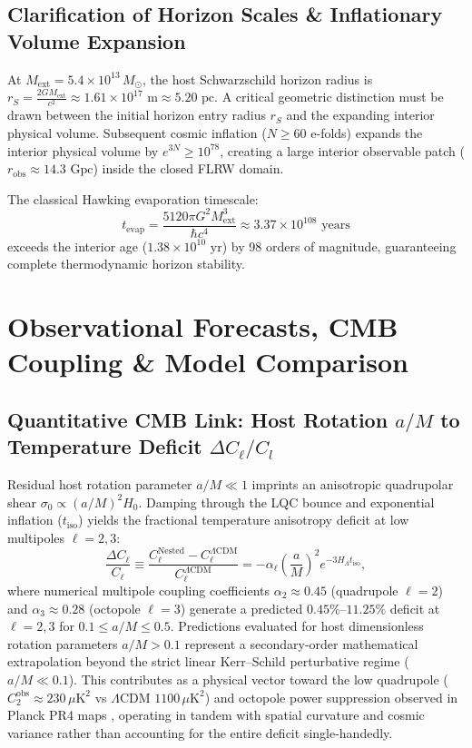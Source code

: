 \documentclass[11pt,a4paper]{article}
\begin{document}
\subsection{Clarification of Horizon Scales \& Inflationary Volume Expansion}\label{sec:causal_decoupling}
At $M_{\text{ext}} = 5.4 \times 10^{13} \, M_\odot$, the host Schwarzschild horizon radius is $r_S = \frac{2GM_{\text{ext}}}{c^2} \approx 1.61 \times 10^{17} \text{ m} \approx 5.20 \text{ pc}$. A critical geometric distinction must be drawn between the initial horizon entry radius $r_S$ and the expanding interior physical volume. Subsequent cosmic inflation ($N \ge 60$ e-folds) expands the interior physical volume by $e^{3N} \ge 10^{78}$, creating a large interior observable patch ($r_{\text{obs}} \approx 14.3 \text{ Gpc}$) inside the closed FLRW domain.

The classical Hawking evaporation timescale:
\begin{equation}\label{eq:hawking_time}
    t_{\text{evap}} = \frac{5120 \pi G^2 M_{\text{ext}}^3}{\hbar c^4} \approx 3.37 \times 10^{108} \text{ years}
\end{equation}
exceeds the interior age ($1.38 \times 10^{10} \text{ yr}$) by 98 orders of magnitude, guaranteeing complete thermodynamic horizon stability.

\section{Observational Forecasts, CMB Coupling \& Model Comparison}\label{sec:observational}

\subsection{Quantitative CMB Link: Host Rotation $a/M$ to Temperature Deficit $\Delta C_\ell / C_l$}\label{sec:cmb_suppression}
Residual host rotation parameter $a/M \ll 1$ imprints an anisotropic quadrupolar shear $\sigma_0 \propto (a/M)^2 H_0$. Damping through the LQC bounce and exponential inflation ($t_{\text{iso}}$) yields the fractional temperature anisotropy deficit at low multipoles $\ell = 2, 3$:
\begin{equation}\label{eq:cmb_deficit}
    \frac{\Delta C_\ell}{C_\ell} \equiv \frac{C_\ell^{\text{Nested}} - C_\ell^{\Lambda\text{CDM}}}{C_\ell^{\Lambda\text{CDM}}} = -\alpha_\ell \left(\frac{a}{M}\right)^2 e^{-3 H_\Lambda t_{\text{iso}}},
\end{equation}
where numerical multipole coupling coefficients $\alpha_2 \approx 0.45$ (quadrupole $\ell=2$) and $\alpha_3 \approx 0.28$ (octopole $\ell=3$) generate a predicted $0.45\%\text{--}11.25\%$ deficit at $\ell = 2, 3$ for $0.1 \le a/M \le 0.5$. Predictions evaluated for host dimensionless rotation parameters $a/M > 0.1$ represent a secondary-order mathematical extrapolation beyond the strict linear Kerr--Schild perturbative regime ($a/M \ll 0.1$). This contributes as a physical vector toward the low quadrupole ($C_2^{\text{obs}} \approx 230 \, \mu\text{K}^2$ vs $\Lambda\text{CDM}$ $1100 \, \mu\text{K}^2$) and octopole power suppression observed in Planck PR4 maps \cite{gaztanaga2021}, operating in tandem with spatial curvature and cosmic variance rather than accounting for the entire deficit single-handedly.
\end{document}
